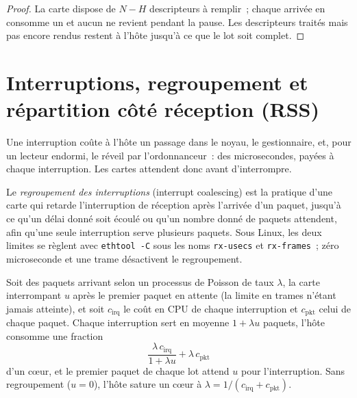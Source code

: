 \begin{proof}
La carte dispose de $N - H$ descripteurs à remplir~; chaque arrivée en consomme un et aucun ne revient pendant la pause. Les descripteurs traités mais
pas encore rendus restent à l'hôte jusqu'à ce que le lot soit complet.
\end{proof}

\section{Interruptions, regroupement et répartition côté réception (RSS)}

Une interruption coûte à l'hôte un passage dans le noyau, le gestionnaire, et, pour un lecteur endormi, le réveil par l'ordonnanceur~: des microsecondes,
payées à chaque interruption. Les cartes attendent donc avant d'interrompre.

\begin{definition}\label{def:nw:network-cards-and-kernel-bypass:coalesce}
Le \emph{regroupement des interruptions} (interrupt coalescing) est la pratique d'une carte qui retarde l'interruption de réception après
l'arrivée d'un paquet, jusqu'à ce qu'un délai donné soit écoulé ou qu'un nombre donné de paquets attendent, afin qu'une seule interruption serve plusieurs paquets.
Sous Linux, les deux limites se règlent avec \texttt{ethtool -C} sous les noms \texttt{rx-usecs} et \texttt{rx-frames}~; zéro
microseconde et une trame désactivent le regroupement.
\end{definition}

\begin{proposition}\label{prop:nw:network-cards-and-kernel-bypass:coalesce}
Soit des paquets arrivant selon un processus de Poisson de taux $\lambda$, la carte interrompant $u$ après le premier paquet en attente (la limite en trames
n'étant jamais atteinte), et soit $c_{\mathrm{irq}}$ le coût en CPU de chaque interruption et $c_{\mathrm{pkt}}$ celui de chaque paquet. Chaque interruption sert en
moyenne $1 + \lambda u$ paquets, l'hôte consomme une fraction
\[
  \frac{\lambda\, c_{\mathrm{irq}}}{1 + \lambda u} + \lambda\, c_{\mathrm{pkt}}
\]
d'un cœur, et le premier paquet de chaque lot attend $u$ pour l'interruption. Sans regroupement ($u = 0$), l'hôte sature un cœur
à $\lambda = 1/(c_{\mathrm{irq}} + c_{\mathrm{pkt}})$.
\end{proposition}

